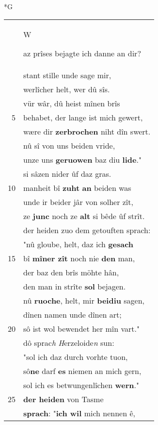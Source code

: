 \documentclass[8pt,a4paper,notitlepage]{article}
\begin{document}
\newpage
\begin{table}[ht]
\begin{minipage}[t]{0.5\linewidth}
\small
\begin{center}*G
\end{center}
\begin{tabular}{rl}
 & \begin{large}W\end{large}az prîses bejagte ich danne an dir?\\ 
 & stant stille unde sage mir,\\ 
 & werlîcher helt, wer dû sîs.\\ 
 & vür wâr, dû heist mînen brîs\\ 
5 & behabet, der lange ist mich gewert,\\ 
 & wære dir \textbf{zerbrochen} niht dîn swert.\\ 
 & nû sî von uns beiden vride,\\ 
 & unze uns \textbf{geruowen} baz diu \textbf{lide}."\\ 
 & si sâzen nider ûf daz gras.\\ 
10 & manheit bî \textbf{zuht} \textbf{an} beiden was\\ 
 & unde ir beider jâr von solher zît,\\ 
 & ze \textbf{junc} noch ze \textbf{alt} si bêde ûf strît.\\ 
 & der heiden zuo dem getouften sprach:\\ 
 & "nû gloube, helt, daz ich \textbf{gesach}\\ 
15 & bî \textbf{mîner zît} noch nie \textbf{den} man,\\ 
 & der baz den brîs möhte hân,\\ 
 & den man in strîte \textbf{sol} bejagen.\\ 
 & nû \textbf{ruoche}, helt, mir \textbf{beidiu} sagen,\\ 
 & dînen namen unde dînen art;\\ 
20 & sô ist wol bewendet her mîn vart."\\ 
 & dô sprac\textit{h} \textit{H}erzeloide\textit{n} sun:\\ 
 & "sol ich daz durch vorhte tuon,\\ 
 & sô\textbf{ne} darf \textbf{es} niemen an mich gern,\\ 
 & sol ich es betwungenlîchen \textbf{wern}."\\ 
25 & \textbf{der heiden} von Tasme\\ 
 & \textbf{sprach}: "\textbf{ich wil} mich nennen ê,\\ 

\end{tabular}
\end{minipage}
\end{table}
\end{document}
